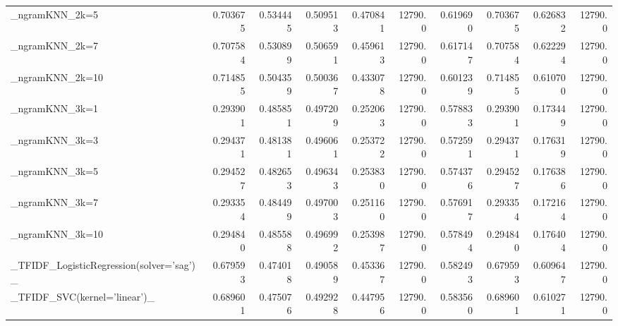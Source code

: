 \begin{tabular}{lrrrrrrrrr}
\_ngramKNN\_2k=5                                     &  0.703675 &         0.534445 &      0.509513 &        0.470841 &        12790.0 &            0.619690 &         0.703675 &           0.626832 &           12790.0 \\
\_ngramKNN\_2k=7                                     &  0.707584 &         0.530899 &      0.506591 &        0.459613 &        12790.0 &            0.617147 &         0.707584 &           0.622294 &           12790.0 \\
\_ngramKNN\_2k=10                                    &  0.714855 &         0.504359 &      0.500367 &        0.433078 &        12790.0 &            0.601239 &         0.714855 &           0.610700 &           12790.0 \\
\_ngramKNN\_3k=1                                     &  0.293901 &         0.485851 &      0.497209 &        0.252063 &        12790.0 &            0.578833 &         0.293901 &           0.173449 &           12790.0 \\
\_ngramKNN\_3k=3                                     &  0.294371 &         0.481381 &      0.496061 &        0.253722 &        12790.0 &            0.572591 &         0.294371 &           0.176319 &           12790.0 \\
\_ngramKNN\_3k=5                                     &  0.294527 &         0.482653 &      0.496343 &        0.253830 &        12790.0 &            0.574376 &         0.294527 &           0.176386 &           12790.0 \\
\_ngramKNN\_3k=7                                     &  0.293354 &         0.484499 &      0.497003 &        0.251160 &        12790.0 &            0.576917 &         0.293354 &           0.172164 &           12790.0 \\
\_ngramKNN\_3k=10                                    &  0.294840 &         0.485588 &      0.496992 &        0.253987 &        12790.0 &            0.578494 &         0.294840 &           0.176404 &           12790.0 \\
\_TFIDF\_LogisticRegression(solver='sag')\_           &  0.679593 &         0.474018 &      0.490589 &        0.453367 &        12790.0 &            0.582493 &         0.679593 &           0.609647 &           12790.0 \\
\_TFIDF\_SVC(kernel='linear')\_                       &  0.689601 &         0.475076 &      0.492928 &        0.447956 &        12790.0 &            0.583560 &         0.689601 &           0.610271 &           12790.0 \\

\end{tabular}
